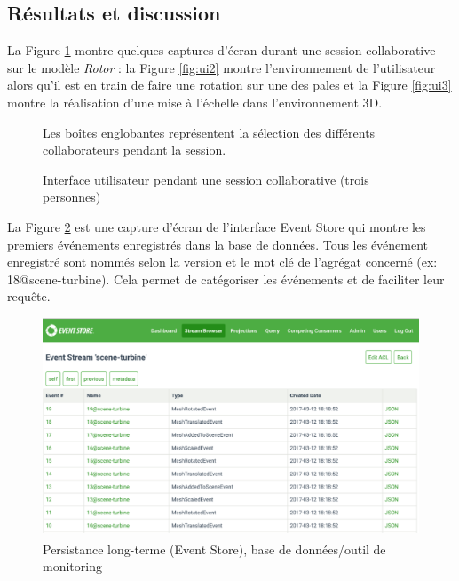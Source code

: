 \subsection{Résultats et discussion}
\label{sec:res}

La Figure \ref{fig:screenshots} montre quelques captures d'écran durant une 
session collaborative sur le modèle \textit{Rotor} :  la Figure \ref{fig:ui2} montre 
l'environnement de l'utilisateur alors qu'il est en train de faire une rotation sur une 
des pales et la Figure \ref{fig:ui3} montre la réalisation d'une mise à l'échelle dans 
l'environnement 3D.
\begin{figure}[ht!]
	\centering
	
	\hfill
	\hfill
	\caption{Interface utilisateur pendant une session collaborative (trois 
		personnes)}{Les boîtes englobantes représentent la sélection des différents 
		collaborateurs pendant la session.}
	\label{fig:screenshots}
\end{figure}

La Figure \ref{fig:ui4} est une capture d'écran de l'interface Event Store qui montre 
les premiers événements enregistrés dans la base de données. Tous les 
événement enregistré sont nommés selon la version et le mot clé de l'agrégat 
concerné (ex: 18@scene-turbine). Cela permet de catégoriser les événements et 
de faciliter leur requête.

\begin{figure}[h!]
	\centering
	\includegraphics[width=\columnwidth]{eps/eventstore.eps}
	\caption{Persistance long-terme (Event Store\textsuperscript{\textregistered}), 
		base de données/outil de monitoring}
	\label{fig:ui4}
\end{figure}


